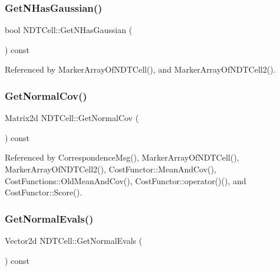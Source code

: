 \mbox{\label{classNDTCell_a2953d2b36d9887794f9aa7637a52c80b}} 
\subsubsection{\texorpdfstring{Get\+N\+Has\+Gaussian()}{GetNHasGaussian()}}
{\footnotesize\ttfamily bool N\+D\+T\+Cell\+::\+Get\+N\+Has\+Gaussian (\begin{DoxyParamCaption}{ }\end{DoxyParamCaption}) const\hspace{0.3cm}{\ttfamily [inline]}}



Referenced by Marker\+Array\+Of\+N\+D\+T\+Cell(), and Marker\+Array\+Of\+N\+D\+T\+Cell2().

\mbox{\label{classNDTCell_a8ea2ea0b713a10d39b3f640d42cdc055}} 
\subsubsection{\texorpdfstring{Get\+Normal\+Cov()}{GetNormalCov()}}
{\footnotesize\ttfamily Matrix2d N\+D\+T\+Cell\+::\+Get\+Normal\+Cov (\begin{DoxyParamCaption}{ }\end{DoxyParamCaption}) const\hspace{0.3cm}{\ttfamily [inline]}}



Referenced by Correspondence\+Msg(), Marker\+Array\+Of\+N\+D\+T\+Cell(), Marker\+Array\+Of\+N\+D\+T\+Cell2(), Cost\+Functor\+::\+Mean\+And\+Cov(), Cost\+Functions\+::\+Old\+Mean\+And\+Cov(), Cost\+Functor\+::operator()(), and Cost\+Functor\+::\+Score().

\mbox{\label{classNDTCell_a352b15be7318d1bccf60029e479491e2}} 
\subsubsection{\texorpdfstring{Get\+Normal\+Evals()}{GetNormalEvals()}}
{\footnotesize\ttfamily Vector2d N\+D\+T\+Cell\+::\+Get\+Normal\+Evals (\begin{DoxyParamCaption}{ }\end{DoxyParamCaption}) const\hspace{0.3cm}{\ttfamily [inline]}}

